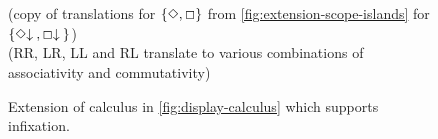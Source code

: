 \begin{figure}[hb]
\begin{mdframed}
    \vspace*{\baselineskip}%
    \begin{pfbox}
    \end{pfbox}
    \begin{pfbox}
    \end{pfbox}
    \\
    \vspace*{\baselineskip}
    \hrulefill
    \\
    \vspace*{\baselineskip}
    (copy of translations for $\{\Diamond,\Box\}$ from
    \autoref{fig:extension-scope-islands} for $\{\Diamond{\downarrow}\:,\Box{\downarrow}\:\}$)
    \\
    \vspace*{\baselineskip}
    ({RR\diDn}, {LR\diDn}, {LL\diDn} and {RL\diDn} translate to
    various combinations of associativity and commutativity)
    \\
    \vspace*{\baselineskip}
  \end{mdframed}
  \caption{Extension of calculus in \autoref{fig:display-calculus}
    which supports infixation.}
  \label{fig:extension-infixation}
\end{figure}
%
